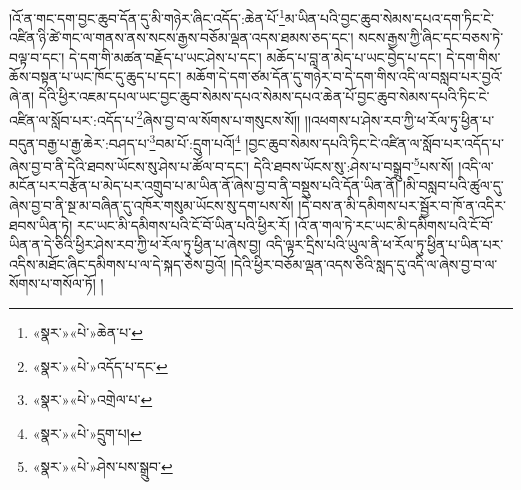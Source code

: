།འོ་ན་གང་དག་བྱང་ཆུབ་དོན་དུ་མི་གཉེར་ཞིང་འདོད་:ཆེན་པོ་\footnote{«སྣར་»«པེ་»ཆེན་པ་}མ་ཡིན་པའི་བྱང་ཆུབ་སེམས་དཔའ་དག་ཏིང་ངེ་འཛིན་ཉི་ཚེ་གང་ལ་གནས་ནས་སངས་རྒྱས་བཅོམ་ལྡན་འདས་ཐམས་ཅད་དང་། སངས་རྒྱས་ཀྱི་ཞིང་དང་བཅས་ཏེ་བལྟ་བ་དང་། དེ་དག་གི་མཚན་བརྗོད་པ་ཡང་ཤེས་པ་དང་། མཆོད་པ་བླ་ན་མེད་པ་ཡང་བྱེད་པ་དང་། དེ་དག་གིས་ཆོས་བསྟན་པ་ཡང་ཁོང་དུ་ཆུད་པ་དང་། མཆོག་དེ་དག་ཙམ་དོན་དུ་གཉེར་བ་དེ་དག་གིས་འདི་ལ་བསླབ་པར་བྱའོ་ཞེ་ན། དེའི་ཕྱིར་འཇམ་དཔལ་ཡང་བྱང་ཆུབ་སེམས་དཔའ་སེམས་དཔའ་ཆེན་པོ་བྱང་ཆུབ་སེམས་དཔའི་ཏིང་ངེ་འཛིན་ལ་སློབ་པར་:འདོད་པ་\footnote{«སྣར་»«པེ་»འདོད་པ་དང་}ཞེས་བྱ་བ་ལ་སོགས་པ་གསུངས་སོ།། །།འཕགས་པ་ཤེས་རབ་ཀྱི་ཕ་རོལ་ཏུ་ཕྱིན་པ་བདུན་བརྒྱ་པ་རྒྱ་ཆེར་:བཤད་པ་\footnote{«སྣར་»«པེ་»འགྲེལ་པ་}བམ་པོ་:དྲུག་པའོ།\footnote{«སྣར་»«པེ་»དྲུག་པ།} །བྱང་ཆུབ་སེམས་དཔའི་ཏིང་ངེ་འཛིན་ལ་སློབ་པར་འདོད་པ་ཞེས་བྱ་བ་ནི་དེའི་ཐབས་ཡོངས་སུ་ཤེས་པ་ཚོལ་བ་དང་། དེའི་ཐབས་ཡོངས་སུ་:ཤེས་པ་བསྒྲུབ་\footnote{«སྣར་»«པེ་»ཤེས་པས་སྒྲུབ་}པས་སོ། །འདི་ལ་མངོན་པར་བརྩོན་པ་མེད་པར་འགྲུབ་པ་མ་ཡིན་ནོ་ཞེས་བྱ་བ་ནི་བསྡུས་པའི་དོན་ཡིན་ནོ། །མི་བསླབ་པའི་ཚུལ་དུ་ཞེས་བྱ་བ་ནི་སྔ་མ་བཞིན་དུ་འཁོར་གསུམ་ཡོངས་སུ་དག་པས་སོ། །དེ་བས་ན་མི་དམིགས་པར་སྦྱོར་བ་ཁོ་ན་འདིར་ཐབས་ཡིན་ཏེ། རང་ཡང་མི་དམིགས་པའི་ངོ་བོ་ཡིན་པའི་ཕྱིར་རོ། །འོ་ན་གལ་ཏེ་རང་ཡང་མི་དམིགས་པའི་ངོ་བོ་ཡིན་ན་དེ་ཅིའི་ཕྱིར་ཤེས་རབ་ཀྱི་ཕ་རོལ་ཏུ་ཕྱིན་པ་ཞེས་བྱ། འདི་ལྟར་དྲིས་པའི་ཡུལ་ནི་ཕ་རོལ་ཏུ་ཕྱིན་པ་ཡིན་པར་འདིས་མཐོང་ཞིང་དམིགས་པ་ལ་དེ་སྐད་ཅེས་བྱའོ། །དེའི་ཕྱིར་བཅོམ་ལྡན་འདས་ཅིའི་སླད་དུ་འདི་ལ་ཞེས་བྱ་བ་ལ་སོགས་པ་གསོལ་ཏོ། །
